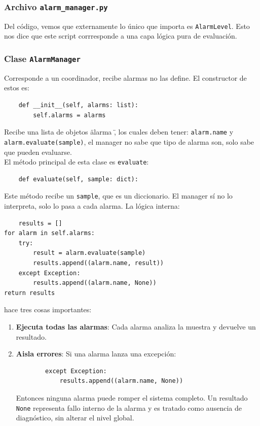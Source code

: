 \documentclass{article}
\begin{document}
\subsubsection{Archivo \texttt{alarm\_manager.py}}

Del código, vemos que externamente lo único que importa es \texttt{AlarmLevel}. Esto nos dice que este script corrresponde a una capa lógica pura de evaluación. 

\subsubsection{Clase \texttt{AlarmManager}}

Corresponde a un coordinador, recibe alarmas no las define. 
El constructor de estos es: 
\begin{lstlisting}
    def __init__(self, alarms: list):
        self.alarms = alarms
\end{lstlisting}

Recibe una lista de objetos \" alarma \", los cuales deben tener:
\texttt{alarm.name} y \texttt{alarm.evaluate(sample)}, el manager no sabe que tipo de alarma son, solo sabe que pueden evaluarse. \\

El método principal de esta clase es \texttt{evaluate}:
\begin{lstlisting}
    def evaluate(self, sample: dict):
\end{lstlisting}
Este método recibe un \texttt{sample}, que es un diccionario. El manager sí no lo interpreta, solo lo pasa a cada alarma. La lógica interna: 
\begin{lstlisting}
    results = []
for alarm in self.alarms:
    try:
        result = alarm.evaluate(sample)
        results.append((alarm.name, result))
    except Exception:
        results.append((alarm.name, None))
return results

\end{lstlisting}
hace tres cosas importantes:
\begin{enumerate}
    \item \textbf{Ejecuta todas las alarmas}: Cada alarma analiza la muestra y devuelve un resultado.
    \item \textbf{Aisla errores}: Si una alarma lanza una excepción:
    \begin{lstlisting}
        except Exception:
            results.append((alarm.name, None))
    \end{lstlisting}
    Entonces ninguna alarma puede romper el sistema completo.
    Un resultado \texttt{None} representa fallo interno de la alarma y es tratado como ausencia de diagnóstico, sin alterar el nivel global.
\end{enumerate}
\end{document}
